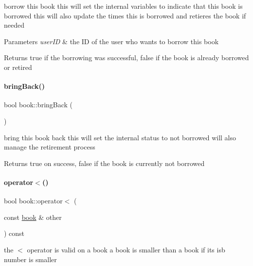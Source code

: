 borrow this book this will set the internal variables to indicate that this book is borrowed this will also update the times this is borrowed and retieres the book if needed


\begin{DoxyParams}{Parameters}
{\em user\+ID} & the ID of the user who wants to borrow this book \\
\hline
\end{DoxyParams}
\begin{DoxyReturn}{Returns}
true if the borrowing was successful, false if the book is already borrowed or retired 
\end{DoxyReturn}
\mbox{\label{classbook_a0db6fec61d11dfb27f20403569289bbb}} 
\paragraph{\texorpdfstring{bring\+Back()}{bringBack()}}
{\footnotesize\ttfamily bool book\+::bring\+Back (\begin{DoxyParamCaption}{ }\end{DoxyParamCaption})}

bring this book back this will set the internal status to not borrowed will also manage the retirement process

\begin{DoxyReturn}{Returns}
true on success, false if the book is currently not borrowed 
\end{DoxyReturn}
\mbox{\label{classbook_a373aa61d941709b14481d3515cc229fe}} 
\paragraph{\texorpdfstring{operator$<$()}{operator<()}}
{\footnotesize\ttfamily bool book\+::operator$<$ (\begin{DoxyParamCaption}\item[{const \hyperlink{classbook}{book} \&}]{other }\end{DoxyParamCaption}) const\hspace{0.3cm}{\ttfamily [inline]}}

the $<$ operator is valid on a book a book is smaller than a book if its isb number is smaller \mbox{\label{classbook_a6b9ded1510aa5ca62f00f5cbc650200e}} 
